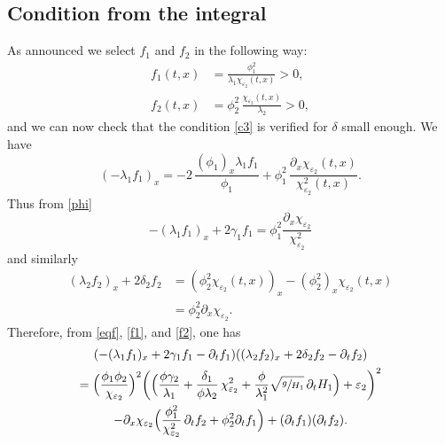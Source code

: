 \documentclass[11pt]{article}
\numberwithin{equation}{section}
\theoremstyle{definition}
\begin{document}
\subsection{Condition from the integral}
{As announced we} select $f_{1}$ and $f_{2}$ in the following way:
\begin{equation}
\begin{split}
f_{1}(t,x)&=\frac{\phi^{2}_{1}}{\lambda_{1}\chi_{\varepsilon_{2}}(t,x)}>0,\\
f_{2}(t,x)&=\phi_{2}^{2}\,\frac{\chi_{\varepsilon_{2}}(t,x)}{\lambda_{2}}>0,
\label{deff1f2}
\end{split}
\end{equation}
and we can now check that the condition \eqref{c3} is verified for $\delta$ small enough. {We have}
\begin{equation*}
(-\lambda_{1}f_{1})_{x}=-2\,\frac{(\phi_{1})_{x}\lambda_{1}f_{1}}{\phi_{1}}+\phi_{1}^{2}\,\frac{\partial_{x}\chi_{\varepsilon_{2}}(t,x)}{\chi_{\varepsilon_{2}}^{2}(t,x)}.
\end{equation*}
Thus from \eqref{phi}
\begin{equation}
-(\lambda_{1}f_{1})_{x}+2\gamma_{1}f_{1}
=\phi_{1}^{2}\frac{\partial_{x}\chi_{\varepsilon_{2}}}{\chi^{2}_{\varepsilon_{2}}}
\label{f1}
\end{equation}
and similarly
\begin{equation}
\begin{split}
(\lambda_{2}f_{2})_{x}+2\delta_{2}f_{2}&=(\phi^{2}_{2}\chi_{\varepsilon_{2}}(t,x))_{x}-(\phi^{2}_{2})_{x}\chi_{\varepsilon_{2}}(t,x)\\
&=\phi_{2}^{2}\partial_{x}\chi_{\varepsilon_{2}}.
\end{split}
\label{f2}
\end{equation}
Therefore, from \eqref{eqf}, \eqref{f1}, and \eqref{f2}, one has
\begin{multline}
\label{cond00}
(-(\lambda_{1}f_{1})_{x}+2\gamma_{1}f_{1}-\partial_{t}f_{1})((\lambda_{2}f_{2})_{x}+2\delta_{2}f_{2}-\partial_{t}f_{2})\\
=\Bigl(\frac{\phi_{1}\phi_{2}}{\chi_{\varepsilon_{2}}} \Bigr)^{2}\biggl(\Bigl(\frac{\phi \gamma_{2}}{\lambda_{1}}+\frac{\delta_{1}}{\phi\lambda_{2}}\,\chi_{\varepsilon_{2}}^{2}+{\frac{\phi}{\lambda_{1}^{2}}}\sqrt{\sfrac{g}{H_{1}}}\,\partial_{t} H_{1} \Bigr)
+\varepsilon_{2} \biggr)^{2}\\
-\partial_{x}\chi_{\varepsilon_{2}} \Bigl(\frac{\phi_{1}^{2}}{\chi^{2}_{\varepsilon_{2}}}\,\partial_{t}f_{2}
+\phi_{2}^{2}\partial_{t}f_{1} \Bigr)
+(\partial_{t}f_{1})(\partial_{t}f_{2}).
\end{multline}
\end{document}
